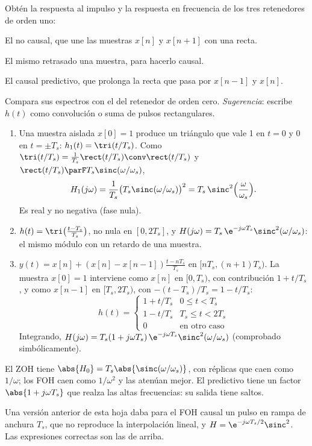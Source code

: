 \documentclass[11pt,a4paper]{scrartcl}
\begin{document}
\begin{ejercicio}
  Obtén la respuesta al impulso y la respuesta en frecuencia de los tres retenedores de orden uno:
  \begin{incisos}[1]
    \item El no causal, que une las muestras $x[n]$ y $x[n+1]$ con una recta.
    \item El mismo retrasado una muestra, para hacerlo causal.
    \item El causal predictivo, que prolonga la recta que pasa por $x[n-1]$ y $x[n]$.
  \end{incisos}
  Compara sus espectros con el del retenedor de orden cero. \emph{Sugerencia}: escribe $h(t)$ como convolución o suma de pulsos rectangulares.
\end{ejercicio}
\begin{solucion}
  \begin{enumerate}[label=\alph*)]
    \item Una muestra aislada $x[0]=1$ produce un triángulo que vale 1 en $t=0$ y 0 en $t=\pm T_s$: $h_1(t)=\tri(t/T_s)$. Como $\tri(t/T_s)=\frac1{T_s}\rect(t/T_s)\conv\rect(t/T_s)$ y $\rect(t/T_s)\parF T_s\sinc(\omega/\omega_s)$,
    \[
      H_1(j\omega)=\frac{1}{T_s}\big(T_s\sinc(\omega/\omega_s)\big)^2=T_s\,\sinc^2\Big(\frac{\omega}{\omega_s}\Big).
    \]
    Es real y no negativa (fase nula).
    \item $h(t)=\tri\big(\frac{t-T_s}{T_s}\big)$, no nula en $[0,2T_s]$, y $H(j\omega)=T_s\,\e^{-j\omega T_s}\sinc^2(\omega/\omega_s)$: el mismo módulo con un retardo de una muestra.
    \item $y(t)=x[n]+(x[n]-x[n-1])\frac{t-nT_s}{T_s}$ en $[nT_s,(n+1)T_s)$. La muestra $x[0]=1$ interviene como $x[n]$ en $[0,T_s)$, con contribución $1+t/T_s$, y como $x[n-1]$ en $[T_s,2T_s)$, con $-(t-T_s)/T_s=1-t/T_s$:
    \[
      h(t)=\begin{cases}1+t/T_s & 0\le t<T_s\\1-t/T_s & T_s\le t<2T_s\\0&\text{en otro caso}\end{cases}
    \]
    Integrando, $H(j\omega)=T_s(1+j\omega T_s)\,\e^{-j\omega T_s}\sinc^2(\omega/\omega_s)$ (comprobado simbólicamente).
  \end{enumerate}
  El ZOH tiene $\abs{H_0}=T_s\abs{\sinc(\omega/\omega_s)}$, con réplicas que caen como $1/\omega$; los FOH caen como $1/\omega^2$ y las atenúan mejor. El predictivo tiene un factor $\abs{1+j\omega T_s}$ que realza las altas frecuencias: su salida tiene saltos.
  \begin{errata}
    Una versión anterior de esta hoja daba para el FOH causal un pulso en rampa de anchura $T_s$, que no reproduce la interpolación lineal, y $H=\e^{-j\omega T_s/2}\sinc^2$. Las expresiones correctas son las de arriba.
  \end{errata}
\end{solucion}
\end{document}
